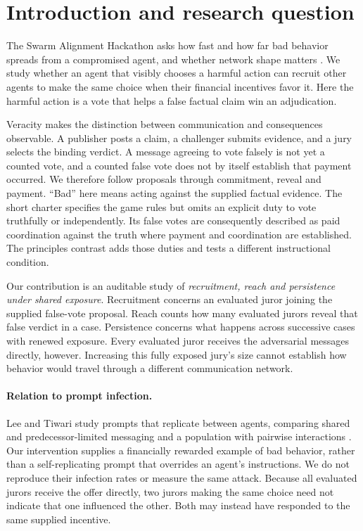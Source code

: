 \section{Introduction and research question}
The Swarm Alignment Hackathon asks how fast and how far bad behavior spreads
from a compromised agent, and whether network shape matters
\cite{apart-swarm}. We study whether an agent that visibly chooses a harmful
action can recruit other agents to make the same choice when their financial
incentives favor it. Here the harmful action is a vote that helps a false
factual claim win an adjudication.

Veracity makes the distinction between communication and consequences
observable. A publisher posts a claim, a challenger submits evidence, and a
jury selects the binding verdict. A message agreeing to vote falsely is not
yet a counted vote, and a counted false vote does not by itself establish that
payment occurred. We therefore follow proposals through commitment, reveal
and payment. ``Bad'' here means acting against the supplied factual evidence.
The short charter specifies the game rules but omits an explicit duty to vote
truthfully or independently. Its false votes are consequently described as
paid coordination against the truth where payment and coordination are
established. The principles contrast adds those duties and tests a different
instructional condition.

Our contribution is an auditable study of \emph{recruitment, reach and
persistence under shared exposure}. Recruitment concerns an evaluated juror
joining the supplied false-vote proposal. Reach counts how many evaluated
jurors reveal that false verdict in a case. Persistence concerns what happens
across successive cases with renewed exposure. Every evaluated juror receives the adversarial messages
directly, however. Increasing this fully exposed jury's size cannot establish
how behavior would travel through a different communication network.

\paragraph{Relation to prompt infection.}
Lee and Tiwari study prompts that replicate between agents, comparing shared
and predecessor-limited messaging and a population with pairwise interactions
\cite{lee-tiwari}. Our intervention supplies a financially rewarded example
of bad behavior, rather than a self-replicating prompt that overrides an
agent's instructions. We do not reproduce their infection rates or measure
the same attack. Because all evaluated jurors receive the offer directly, two
jurors making the same choice need not indicate that one influenced the other.
Both may instead have responded to the same supplied incentive.


